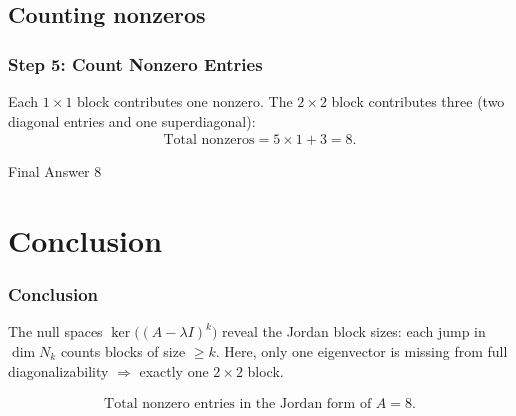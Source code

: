 \documentclass{beamer}
\numberwithin{equation}{section}
\begin{document}
\subsection{Counting nonzeros}
\begin{frame}
\frametitle{Step 5: Count Nonzero Entries}
Each $1\times1$ block contributes one nonzero.  
The $2\times2$ block contributes three (two diagonal entries and one superdiagonal):
\begin{align}
\text{Total nonzeros}=5\times1+3=8.
\end{align}
\begin{block}{\centering Final Answer}
\Large \(\boxed{8}\)
\end{block}
\end{frame}

\section{Conclusion}
\begin{frame}
\frametitle{Conclusion}
The null spaces $\ker\!\big((A-\lambda I)^k\big)$ reveal the Jordan block sizes: each jump in $\dim N_k$ counts blocks of size $\ge k$.  
Here, only one eigenvector is missing from full diagonalizability $\Rightarrow$ exactly one $2\times2$ block.

\begin{align}
\boxed{\text{Total nonzero entries in the Jordan form of }A=8.}
\end{align}
\end{frame}
\end{document}
